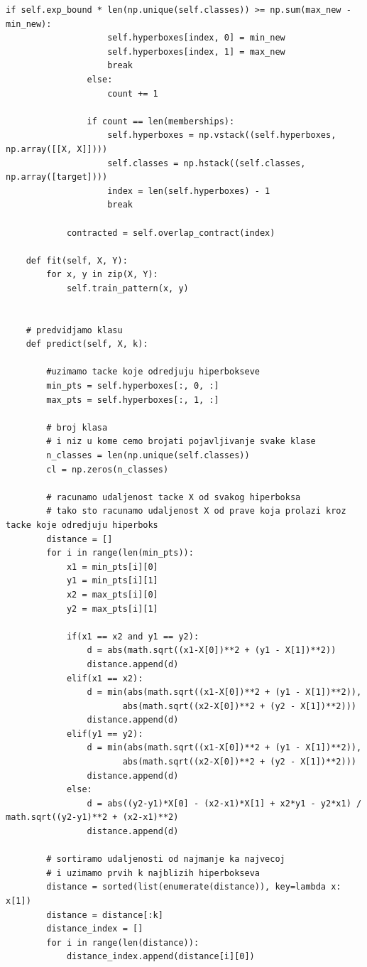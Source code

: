 \documentclass[a4paper]{article}
\begin{document}
\begin{lstlisting}[caption={Klasa koja predstavlja Fazi Min Max klasifikator koji koristi KNN},frame=single, label=particle]
                if self.exp_bound * len(np.unique(self.classes)) >= np.sum(max_new - min_new):
                    self.hyperboxes[index, 0] = min_new
                    self.hyperboxes[index, 1] = max_new
                    break
                else:
                    count += 1

                if count == len(memberships):
                    self.hyperboxes = np.vstack((self.hyperboxes, np.array([[X, X]])))
                    self.classes = np.hstack((self.classes, np.array([target])))
                    index = len(self.hyperboxes) - 1
                    break
                    
            contracted = self.overlap_contract(index)
        
    def fit(self, X, Y):
        for x, y in zip(X, Y):
            self.train_pattern(x, y)

    
    # predvidjamo klasu
    def predict(self, X, k):
        
        #uzimamo tacke koje odredjuju hiperbokseve
        min_pts = self.hyperboxes[:, 0, :]
        max_pts = self.hyperboxes[:, 1, :]
      
        # broj klasa 
        # i niz u kome cemo brojati pojavljivanje svake klase
        n_classes = len(np.unique(self.classes))
        cl = np.zeros(n_classes)
        
        # racunamo udaljenost tacke X od svakog hiperboksa
        # tako sto racunamo udaljenost X od prave koja prolazi kroz tacke koje odredjuju hiperboks
        distance = []
        for i in range(len(min_pts)):
            x1 = min_pts[i][0]
            y1 = min_pts[i][1]
            x2 = max_pts[i][0]
            y2 = max_pts[i][1]
            
            if(x1 == x2 and y1 == y2):
                d = abs(math.sqrt((x1-X[0])**2 + (y1 - X[1])**2))
                distance.append(d)
            elif(x1 == x2):
                d = min(abs(math.sqrt((x1-X[0])**2 + (y1 - X[1])**2)), 
                       abs(math.sqrt((x2-X[0])**2 + (y2 - X[1])**2)))
                distance.append(d)
            elif(y1 == y2):
                d = min(abs(math.sqrt((x1-X[0])**2 + (y1 - X[1])**2)), 
                       abs(math.sqrt((x2-X[0])**2 + (y2 - X[1])**2)))
                distance.append(d)
            else:
                d = abs((y2-y1)*X[0] - (x2-x1)*X[1] + x2*y1 - y2*x1) / math.sqrt((y2-y1)**2 + (x2-x1)**2)
                distance.append(d)

        # sortiramo udaljenosti od najmanje ka najvecoj
        # i uzimamo prvih k najblizih hiperbokseva
        distance = sorted(list(enumerate(distance)), key=lambda x: x[1])
        distance = distance[:k]
        distance_index = []
        for i in range(len(distance)):
            distance_index.append(distance[i][0])
            

\end{lstlisting}
\end{document}
